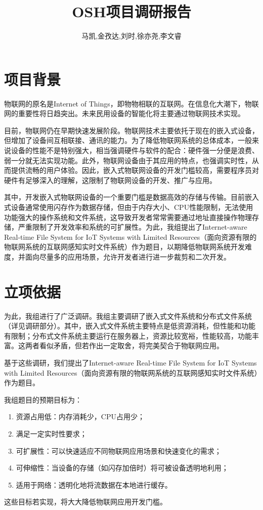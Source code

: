 \documentclass{ctexart}
\begin{document}
\title{OSH项目调研报告}
\author{马凯,金孜达,刘时,徐亦尧,李文睿}
\maketitle
\tableofcontents
\section{项目背景}
物联网的原名是Internet of Things，即物物相联的互联网。在信息化大潮下，物联网的重要性将日趋突出。未来民用设备的智能化将主要通过物联网技术实现。

目前，物联网仍在早期快速发展阶段。物联网技术主要依托于现在的嵌入式设备，但增加了设备间互相联接、通讯的能力。为了降低物联网系统的总体成本，一般来说设备的性能不是特别强大，相当强调硬件与软件的配合：硬件强一分便是浪费、弱一分就无法实现功能。此外，物联网设备由于其应用的特点，也强调实时性，从而提供流畅的用户体验。因此，嵌入式物联网设备的开发门槛较高，需要程序员对硬件有足够深入的理解，这限制了物联网设备的开发、推广与应用。

其中，开发嵌入式物联网设备的一个重要门槛是数据高效的存储与传输。目前嵌入式设备通常使用闪存作为数据存储，但由于内存大小、CPU性能限制，无法使用功能强大的操作系统和文件系统，这导致开发者常常需要通过地址直接操作物理存储，严重限制了开发效率和系统的可扩展性。为此，我组提出了Internet-aware Real-time File System for IoT Systems with Limited Resources（面向资源有限的物联网系统的互联网感知实时文件系统）作为题目，以期降低物联网系统开发难度，并面向尽量多的应用场景，允许开发者进行进一步裁剪和二次开发。
\section{立项依据}
为此，我组进行了广泛调研。我组主要调研了嵌入式文件系统和分布式文件系统（详见调研部分）。其中，嵌入式文件系统主要特点是低资源消耗，但性能和功能有限制；分布式文件系统主要运行在服务器上，资源比较宽裕，性能较高，功能丰富。这两者看似矛盾，但若作出一定取舍，将完美契合于物联网应用。

基于这些调研，我们提出了Internet-aware Real-time File System for IoT Systems with Limited Resources（面向资源有限的物联网系统的互联网感知实时文件系统）作为题目。

我组题目的预期目标为：
\begin{enumerate}
	\item 资源占用低：内存消耗少，CPU占用少；
	\item 满足一定实时性要求；
	\item 可扩展性：可以快速适应不同物联网应用场景和快速变化的需求；
	\item 可伸缩性：当设备的存储（如闪存加倍时）将可被设备透明地利用；
	\item 适用于网络：透明化地将流数据在本地进行缓存。
\end{enumerate}
这些目标若实现，将大大降低物联网应用开发门槛。
\end{document}
